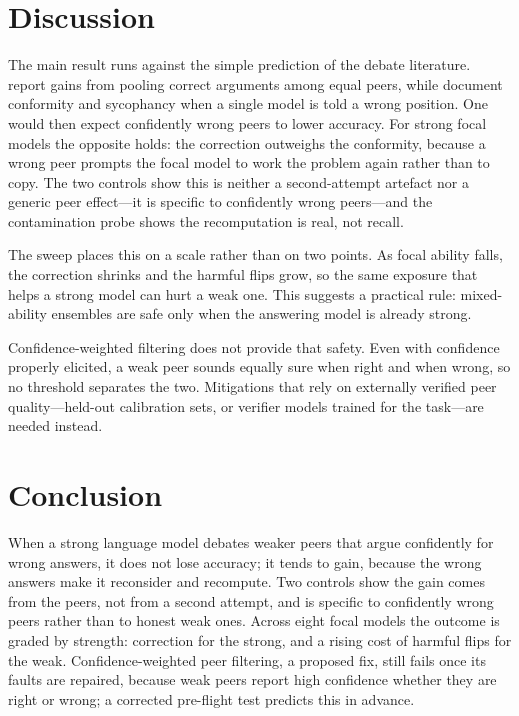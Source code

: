 \documentclass[11pt]{article}
\begin{document}
\section{Discussion}
\label{sec:discussion}

The main result runs against the simple prediction of the debate
literature.
\citet{du2023improving} report gains from pooling correct arguments among
equal peers, while \citet{koo2024benchmarking,sharma2023towards} document
conformity and sycophancy when a single model is told a wrong position.
One would then expect confidently wrong peers to lower accuracy.
For strong focal models the opposite holds: the correction outweighs the
conformity, because a wrong peer prompts the focal model to work the
problem again rather than to copy.
The two controls show this is neither a second-attempt artefact nor a
generic peer effect---it is specific to confidently wrong peers---and the
contamination probe shows the recomputation is real, not recall.

The sweep places this on a scale rather than on two points.
As focal ability falls, the correction shrinks and the harmful flips grow,
so the same exposure that helps a strong model can hurt a weak one.
This suggests a practical rule: mixed-ability ensembles are safe only when
the answering model is already strong.

Confidence-weighted filtering does not provide that safety.
Even with confidence properly elicited, a weak peer sounds equally sure
when right and when wrong, so no threshold separates the two.
Mitigations that rely on externally verified peer quality---held-out
calibration sets, or verifier models trained for the task---are needed
instead.

\section{Conclusion}
\label{sec:conclusion}

When a strong language model debates weaker peers that argue confidently
for wrong answers, it does not lose accuracy; it tends to gain, because the
wrong answers make it reconsider and recompute.
Two controls show the gain comes from the peers, not from a second attempt,
and is specific to confidently wrong peers rather than to honest weak ones.
Across eight focal models the outcome is graded by strength: correction for
the strong, and a rising cost of harmful flips for the weak.
Confidence-weighted peer filtering, a proposed fix, still fails once its
faults are repaired, because weak peers report high confidence whether they
are right or wrong; a corrected pre-flight test predicts this in advance.
\end{document}
